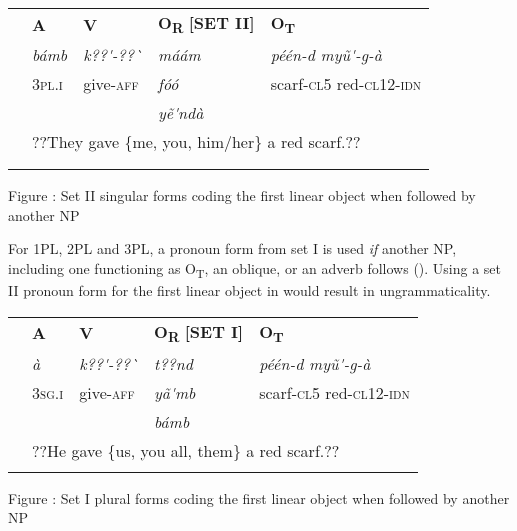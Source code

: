 \documentclass[output=paper]{langsci/langscibook}
\begin{document}
{{\begin{tabular}{lllll} & \textbf{A} & \textbf{V} & \textbf{O}\textbf{\textsubscript{R}}\textbf{ [SET II]} & \textbf{O}\textbf{\textsubscript{T}}\\
\lsptoprule
& \textit{b\'{a}mb} & \textit{k??\'{ }-??\`{ }} & \textit{m\'{a}\'{a}m} & \textit{p\'{e}\'{e}n-d      my\~{u}\'{ }-g-\`{a}}\\
& 3\textsc{pl.i} & give-\textsc{aff} & \textit{f\'{o}\'{o}} & scarf-\textsc{cl5 } red-\textsc{cl12-idn}\\
&  &  & \textit{y\~{e}\'{ }nd\`{a}} & \\
& \multicolumn{4}{l}{??They gave \{me, you, him/her\} a red scarf.??}\\
& \multicolumn{4}{l}{}\\
\lspbottomrule
\end{tabular}
\begin{styleTabellenberschrift}
Figure : Set II singular forms coding the first linear object when followed by another NP
\end{styleTabellenberschrift}

For 1PL, 2PL and 3PL, a pronoun form from set I is used \textit{if} another NP, including one functioning as O\textsubscript{T}, an oblique, or an adverb follows (). Using a set II pronoun form for the first linear object in  would result in ungrammaticality.

\begin{tabular}{lllll} & \textbf{A} & \textbf{V} & \textbf{O}\textbf{\textsubscript{R}}\textbf{ [SET I]} & \textbf{O}\textbf{\textsubscript{T}}\textbf{ }\\
\lsptoprule
& \textit{\`{a}} & \textit{k??\'{ }-??\`{ }} & \textit{t??nd} & \textit{p\'{e}\'{e}n-d         my\~{u}\'{ }-g-\`{a}}\\
& 3\textsc{sg.i} & give-\textsc{aff} & \textit{y\~{a}\'{ }mb} & scarf-\textsc{cl5}    red-\textsc{cl12-idn}\\
&  &  & \textit{b\'{a}mb} & \\
& \multicolumn{4}{l}{??He gave \{us, you all, them\} a red scarf.??

}\\
\lspbottomrule
\end{tabular}
\begin{styleTabellenberschrift}
\label{bkm:Ref424143970}Figure : Set I plural forms coding the first linear object when followed by another NP
\end{styleTabellenberschrift}

}}
\end{document}
